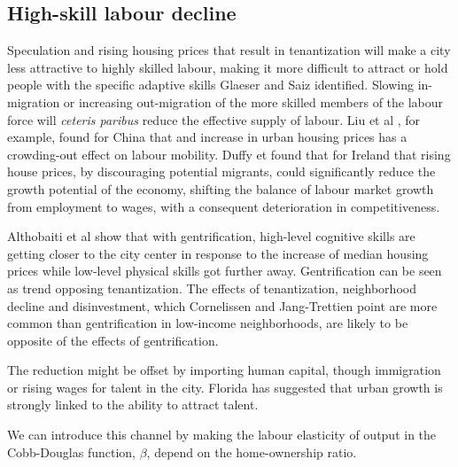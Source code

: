 \subsection{High-skill labour decline}

 Speculation and rising housing prices that result in tenantization will make a city less attractive to highly skilled labour, making it more difficult to attract or hold people with the specific adaptive skills Glaeser and Saiz \cite{glaeserRiseSkilledCity2003} identified. Slowing in-migration or increasing out-migration of the more skilled members of the labour force  will \textit{ceteris paribus} reduce the effective supply of labour. 
Liu et al \cite{liuImpactUrbanHousing2023}, for example, found for China that and increase in urban housing prices has a crowding-out effect on labour mobility.  Duffy et  \cite{duffyRisingHousePrices2005} found that for Ireland that rising house prices, by discouraging potential migrants, could significantly reduce the growth potential of the economy, shifting the balance of labour market growth from employment to wages, with a consequent deterioration in competitiveness. %

Althobaiti et al \cite{althobaitiHousingPricesSkills2021}  show that with gentrification, high-level cognitive skills are getting closer to the city center in response to the increase of median housing prices while low-level physical skills got further away.  Gentrification can be seen as trend opposing tenantization. The effects of tenantization, neighborhood decline and disinvestment, which Cornelissen and Jang-Trettien \cite{cornelissenHousingContextNeighborhood2023} point  are more common than gentrification in low-income neighborhoods, are likely to be opposite of the effects of  gentrification.

The reduction might be offset by importing human capital, though immigration or rising wages for talent in the city. Florida\cite{floridaCompetingAgeTalent2005, floridaCreativeClassEconomic2014} has suggested that urban growth is strongly linked to the ability to attract talent. 

We can introduce this channel by making  the labour elasticity of output in the Cobb-Douglas function, $\beta$, depend on the home-ownership ratio.  


